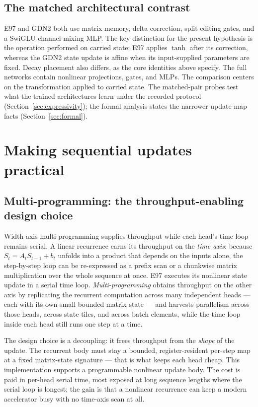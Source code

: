 \documentclass[10pt]{article}
\theoremstyle{canonical}
\theoremstyle{canonicalbullet}
\begin{document}
\subsection*{The matched architectural contrast}


E97 and GDN2 both use matrix memory, delta correction, split editing gates, and a SwiGLU channel-mixing MLP. The key distinction for the present hypothesis is the operation performed on carried state: E97 applies $\operatorname{tanh}$ after its correction, whereas the GDN2 state update is affine when its input-supplied parameters are fixed. Decay placement also differs, as the core identities above specify. The full networks contain nonlinear projections, gates, and MLPs. The comparison centers on the transformation applied to carried state. The matched-pair probes test what the trained architectures learn under the recorded protocol (Section~\ref{sec:expressivity}); the formal analysis states the narrower update-map facts (Section~\ref{sec:formal}).


\section{Making sequential updates practical}\label{sec:systems}



\subsection*{Multi-programming: the throughput-enabling design choice}


Width-axis multi-programming supplies throughput while each head's time loop remains serial. A linear recurrence earns its throughput on the \emph{time axis}: because ${S }_{t } =  {A }_{t } {S }_{t - 1} +  {b }_{t }$ unfolds into a product that depends on the inputs alone, the step-by-step loop can be re-expressed as a prefix scan or a chunkwise matrix multiplication over the whole sequence at once. E97 executes its nonlinear state update in a serial time loop. \emph{Multi-programming} obtains throughput on the other axis by replicating the recurrent computation across many independent heads --- each with its own small bounded matrix state --- and harvests parallelism across those heads, across state tiles, and across batch elements, while the time loop inside each head still runs one step at a time.

The design choice is a decoupling: it frees throughput from the \emph{shape} of the update. The recurrent body must stay a bounded, register-resident per-step map at a fixed matrix-state signature --- that is what keeps each head cheap. This implementation supports a programmable nonlinear update body. The cost is paid in per-head serial time, most exposed at long sequence lengths where the serial loop is longest; the gain is that a nonlinear recurrence can keep a modern accelerator busy with no time-axis scan at all.
\end{document}
